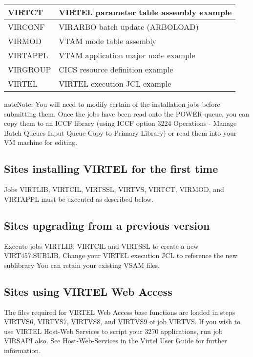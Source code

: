 \documentclass[letterpaper,10pt,english]{sphinxmanual}
\begin{document}
\begin{savenotes}
\begin{tabulary}{\linewidth}[t]{|T|T|}
\hline
VIRTCT
&
VIRTEL parameter table assembly example
\\
\hline
VIRCONF
&
VIRARBO batch update (ARBOLOAD)
\\
\hline
VIRMOD
&
VTAM mode table assembly
\\
\hline
VIRTAPPL
&
VTAM application major node example
\\
\hline
VIRGROUP
&
CICS resource definition example
\\
\hline
VIRTEL
&
VIRTEL execution JCL example
\\
\hline
\end{tabulary}
\par
\sphinxattableend\end{savenotes}

\begin{sphinxadmonition}{note}{Note:}
You will need to modify certain of the installation jobs before submitting them. Once the jobs have been read onto the POWER queue, you can copy them to an ICCF library (using ICCF option 3224 Operations - Manage Batch Queues \textendash{} Input Queue \textendash{} Copy to Primary Library) or read them into your VM machine for editing.
\end{sphinxadmonition}


\subsection{Sites installing VIRTEL for the first time}
\label{\detokenize{Installation_Guide:sites-installing-virtel-for-the-first-time}}
Jobs VIRTLIB, VIRTCIL, VIRTSSL, VIRTVS, VIRTCT, VIRMOD, and VIRTAPPL must be executed as described below.


\subsection{Sites upgrading from a previous version}
\label{\detokenize{Installation_Guide:sites-upgrading-from-a-previous-version}}
Execute jobs VIRTLIB, VIRTCIL and VIRTSSL to create a new VIRT457.SUBLIB. Change your VIRTEL execution JCL to reference the new sublibrary You can retain your existing VSAM files.


\subsection{Sites using VIRTEL Web Access}
\label{\detokenize{Installation_Guide:sites-using-virtel-web-access}}
The files required for VIRTEL Web Access base functions are loaded in steps VIRTVS6, VIRTVS7, VIRTVS8, and VIRTVS9 of job VIRTVS. If you wish to use VIRTEL Host-Web Services to script your 3270 applications, run job VIRSAPI also. See Host-Web-Services in the Virtel User Guide for further information.
\end{document}
